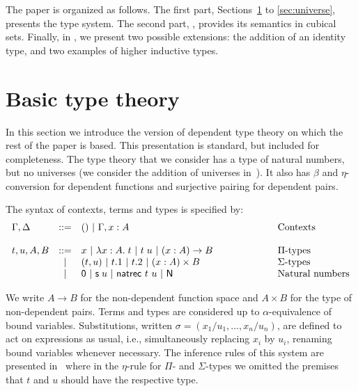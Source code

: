 \medskip

The paper is organized as follows. The first part,
Sections~\ref{sec:basictt} to \ref{sec:universe}, presents the type
system. The second part, , provides its semantics
in cubical sets. Finally, in , we present two
possible extensions: the addition of an identity type, and two
examples of higher inductive types.

\section{Basic type theory}\label{sec:basictt}

In this section we introduce the version of dependent type theory on
which the rest of the paper is based. This presentation is standard,
but included for completeness. The type theory that we consider has a
type of natural numbers, but no universes (we consider the addition of
universes in~). It also has $\beta$ and
$\eta$-conversion for dependent functions and surjective pairing for
dependent pairs.

The syntax of contexts, terms and types is specified by:
%
\[
\begin{array}{lcll}
  \Gamma,\Delta & ::= & () {~\mid~} \Gamma, x : A & \hspace{2cm}\text{Contexts}\\ \\
  t,u,A,B       & ::= & x {~\mid~} \lambda x : A. \; t {~\mid~} t \; u {~\mid~} (x : A) \rightarrow B & \hspace{2cm}\Pi\text{-types} \\
                & {~\mid~}  & (t,u) {~\mid~} t.1 {~\mid~} t.2 {~\mid~} (x : A) \times B & \hspace{2cm}\Sigma\text{-types} \\
                & {~\mid~}  & {\sf 0} {~\mid~} {\sf s} \; u {~\mid~} {\sf natrec}~t~u {~\mid~} \hbox{\sf N} & \hspace{2cm}\text{Natural numbers} \\
\end{array}
\]

We write $A \rightarrow B$ for the non-dependent function space and
$A \times B$ for the type of non-dependent pairs. Terms and types are
considered up to $\alpha$-equivalence of bound
variables. Substitutions, written
$\sigma = ({x_1}/{u_1}, \dots, {x_n}/{u_n})$, are defined to act on
expressions as usual, i.e., simultaneously replacing $x_i$ by $u_i$,
renaming bound variables whenever necessary.  The inference rules of
this system are presented in~ where in the
$\eta$-rule for $\Pi$- and $\Sigma$-types we omitted the premises that
$t$ and $u$ should have the respective type.


